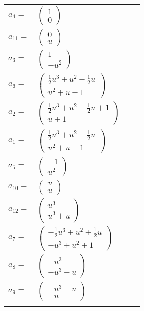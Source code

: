 \documentclass[1p]{elsarticle_modified}
\theoremstyle{definition}
\begin{document}
\begin{tabular}{m{7pt} m{180pt} m{7pt} m{180pt} }
\flushright $a_{4}=$&$\begin{pmatrix}1\\0\end{pmatrix}$ \\
\flushright $a_{11}=$&$\begin{pmatrix}0\\u\end{pmatrix}$ \\
\flushright $a_{3}=$&$\begin{pmatrix}1\\- u^2\end{pmatrix}$ \\
\flushright $a_{6}=$&$\begin{pmatrix}\frac{1}{2} u^3+u^2+\frac{1}{2} u\\u^2+u+1\end{pmatrix}$ \\
\flushright $a_{2}=$&$\begin{pmatrix}\frac{1}{2} u^3+u^2+\frac{1}{2} u+1\\u+1\end{pmatrix}$ \\
\flushright $a_{1}=$&$\begin{pmatrix}\frac{1}{2} u^3+u^2+\frac{1}{2} u\\u^2+u+1\end{pmatrix}$ \\
\flushright $a_{5}=$&$\begin{pmatrix}-1\\u^2\end{pmatrix}$ \\
\flushright $a_{10}=$&$\begin{pmatrix}u\\u\end{pmatrix}$ \\
\flushright $a_{12}=$&$\begin{pmatrix}u^3\\u^3+u\end{pmatrix}$ \\
\flushright $a_{7}=$&$\begin{pmatrix}-\frac{1}{2} u^3+u^2+\frac{1}{2} u\\- u^3+u^2+1\end{pmatrix}$ \\
\flushright $a_{8}=$&$\begin{pmatrix}- u^3\\- u^3- u\end{pmatrix}$ \\
\flushright $a_{9}=$&$\begin{pmatrix}- u^3- u\\- u\end{pmatrix}$\\&\end{tabular}
\end{document}
